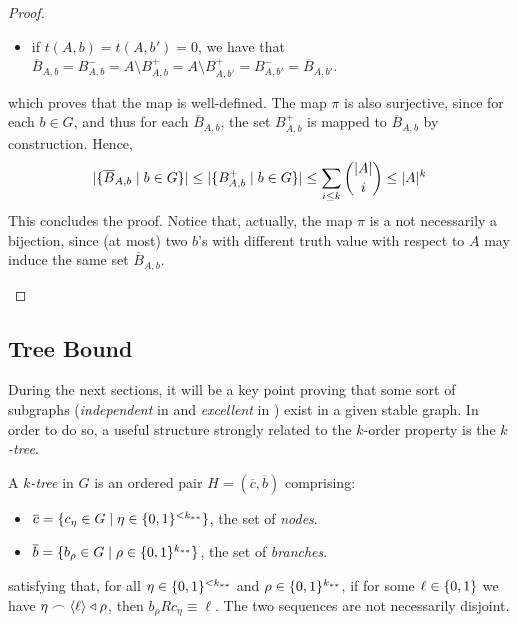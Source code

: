 \begin{corollary}[Claim 2.6.1]
\begin{proof}
\begin{enumerate}
\begin{itemize}
                            \item if $t(A,b) = t(A,b') = 0$, we have that
                            $\overline{B}_{A,b} = B^-_{A,b} = A \setminus B^+_{A,b} = A \setminus B^+_{A,b'} = B^-_{A,b'} = \overline{B}_{A,b'}$.
                        \end{itemize}
                        which proves that the map is well-defined.
                        The map $\pi$ is also surjective, since for each $b \in G$, and thus for each $\overline{B}_{A,b}$,
                        the set $B^+_{A,b}$ is mapped to $\overline{B}_{A,b}$ by construction.
                        Hence,
                        \[
                            | \{ \overline{B}_{A,b} \mid b \in G \} | \leq
                            | \{ B^+_{A,b} \mid b \in G \} | \leq
                            \sum_{i \leq k} \binom{|A|}{i} \leq |A|^k
                        \]
                        This concludes the proof.
                        Notice that, actually, the map $\pi$ is a not necessarily a bijection, since (at most) two $b$'s with
                        different truth value with respect to $A$ may induce the same set $\overline{B}_{A,b}$.
                \end{enumerate}
            \end{proof}
        \end{corollary}

    \subsection{Tree Bound} \label{subsec:subsection_3.2}

        During the next sections, it will be a key point proving that some sort of  subgraphs
        (\emph{independent} in  and \emph{excellent} in ) exist in a given
        stable graph.
        In order to do so, a useful structure strongly related to the $k$-order property is the \emph{$k$-tree}.

        \begin{definition} \label{def:k-tree}
            A \emph{$k$-tree} in $G$ is an ordered pair $H = (\overline{c},\overline{b})$ comprising:
            \begin{itemize}
                \item $\overline{c} = \{  c_\eta \in G \mid \eta \in \{ 0,1 \}^{<k_{**}}  \}$, the set of \emph{nodes}.
                \item $\overline{b} = \{  b_\rho \in G \mid \rho \in \{ 0,1 \}^{k_{**}}  \}$, the set of \emph{branches}.
            \end{itemize}
            satisfying that, for all $\eta \in \{ 0,1 \}^{<k_{**}}$ and $\rho \in \{ 0,1 \}^{k_{**}}$,
            if for some $\ell \in \{ 0, 1 \}$ we have $\eta \frown \left< \ell \right> \triangleleft \rho$, then
            $b_\rho R c_\eta \equiv \ell$.
            The two sequences are not necessarily disjoint. 
        \end{definition}

